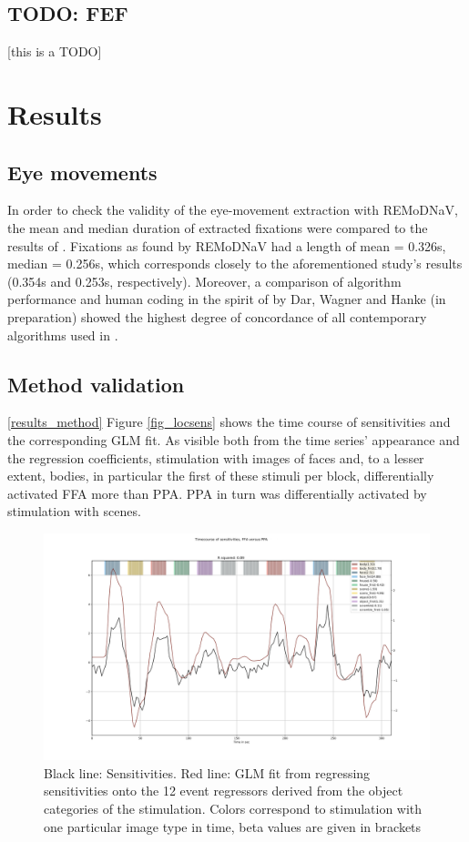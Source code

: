 \documentclass[a4paper, 12pt]{scrreprt}
\begin{document}
\section{TODO: FEF}
[this is a TODO]




\chapter{Results}

\section{Eye movements}
In order to check the validity of the eye-movement extraction with REMoDNaV, the mean and median duration of extracted fixations were compared to the results of \textcite{dorr2010variability}. Fixations as found by REMoDNaV had a length of mean = 0.326s, median = 0.256s, which corresponds closely to the aforementioned study's results (0.354s and 0.253s, respectively). Moreover, a comparison of algorithm performance and human coding in the spirit of \textcite{andersson2017one} by Dar, Wagner and Hanke (in preparation) showed the highest degree of concordance of all contemporary algorithms used in \textcite{anderson2015comparison}.

\bigskip

\section{Method validation}\ref{results_method}
Figure \ref{fig_locsens} shows the time course of sensitivities and the corresponding GLM fit. As visible both from the time series' appearance and the regression coefficients, stimulation with images of faces and, to a lesser extent, bodies, in particular the first of these stimuli per block, differentially activated FFA more than PPA. PPA in turn was differentially activated by stimulation with scenes.
\begin{figure}
	\includegraphics[scale=0.4]{img/res_sens_timecourse_localizer.png}
	\caption[Time course of sensitivites for localizer data]{\small{Black line: Sensitivities. Red line: GLM fit from regressing sensitivities onto the 12 event regressors derived from the object categories of the stimulation. Colors correspond to stimulation with one particular image type in time, beta values are given in brackets}}
	\label{fig:locsens}
\end{figure}
\end{document}
